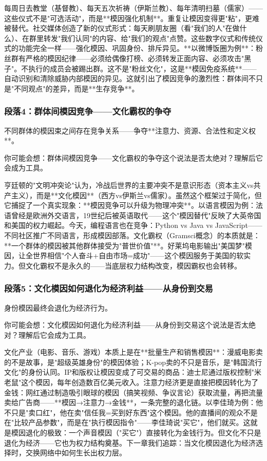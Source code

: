 \documentclass[openany, a4paper, 12pt]{book}
\newenvironment{motivation}{
	\vspace{0.5em}
	\begin{tcolorbox}[
		colback=gray!10,           %
		colframe=gray!60,          %
		title=\textit{本章动机 (Motivation)},
		fonttitle=\bfseries,
		arc=0mm,                   %
		leftrule=3mm               %
		]
		\small \itshape %
	}{
	\end{tcolorbox}
	\vspace{1em}
}
\begin{document}
\begin{motivation}
\begin{motivation}
\begin{motivation}
每周日去教堂（基督教）、每天五次祈祷（伊斯兰教）、每年清明扫墓（儒家）——这些仪式不是"可选活动"，而是**模因强化机制**。重复让模因变得更"粘"，更难被替代。社交媒体创造了新的仪式形式：每天刷朋友圈（看"我们的人"在做什么）、在群里转发"我们认同"的内容、给"我们的观点"点赞。这些数字仪式和传统仪式的功能完全一样——强化模因、巩固身份、排斥异见。**以微博饭圈为例**：粉丝群有严格的模因纪律——必须给偶像打榜、必须转发正面内容、必须攻击"黑子"。不执行的成员会被踢出群。这不是"粉丝文化"，这是**模因免疫系统**——自动识别和清除威胁内部模因的异见。这就引出了模因竞争的激烈性：群体间不只是"不同观点"的差异，而是**生存竞争**。

	\subsubsection*{段落4：群体间模因竞争——文化霸权的争夺}
	不同群体的模因束之间存在竞争关系——争夺**注意力、资源、合法性和定义权**。
	\begin{tcolorbox}[colback=yellow!5, title=\textit{读者行为预测}]
		你可能会想：群体间模因竞争——文化霸权的争夺这个说法是否太绝对？理解后它会成为工具。
	\end{tcolorbox}

亨廷顿的"文明冲突论"认为，冷战后世界的主要冲突不是意识形态（资本主义vs共产主义），而是**文化模因**（西方vs伊斯兰vs儒家）。虽然这个框架过于简化，但它捕捉了一个真实现象：**模因竞争可以升级为物理冲突**。以语言模因为例：法语曾经是欧洲外交语言，19世纪后被英语取代——这个"模因替代"反映了大英帝国和美国的权力崛起。今天，编程语言也在竞争：Python vs Java vs JavaScript——不同社区推广不同语言，形成模因部落。文化霸权（Gramsci概念）的本质就是：**一个群体的模因被其他群体接受为"普世价值"**。好莱坞电影输出"美国梦"模因，让全世界相信"个人奋斗+自由市场=成功"——这个模因服务于美国的软实力。但文化霸权不是永久的——当底层权力结构改变，模因霸权也会转移。

	\subsubsection*{段落5：文化模因如何退化为经济利益——从身份到交易}
	身份模因最终会退化为经济行为。
	\begin{tcolorbox}[colback=yellow!5, title=\textit{读者行为预测}]
		你可能会想：文化模因如何退化为经济利益——从身份到交易这个说法是否太绝对？理解后它会成为工具。
	\end{tcolorbox}

文化产业（电影、音乐、游戏）本质上是在**批量生产和销售模因**：漫威电影卖的不是故事，是"超级英雄身份"的模因体验；K-pop卖的不只是音乐，是"韩国流行文化"的身份认同。IP和版权让模因变成了可交易的商品：迪士尼通过版权控制"米老鼠"这个模因，每年创造数百亿美元收入。注意力经济更是直接把模因转化为了金钱：网红通过制造吸引眼球的模因（搞笑视频、争议言论）获取流量，再把流量卖给广告商——**模因→注意力→金钱**，一条完整的退化链。以李佳琦为例：他不只是"卖口红"，他在卖"信任我=买到好东西"这个模因。他的直播间的观众不是在"比较产品参数"，而是在"执行模因指令"——李佳琦说"买它"，他们就买。这就是模因退化的极致：一个声音模因（"买它"）直接转化为金钱行为。但文化不只是退化为经济——它也为权力结构奠基。下一章我们追踪：当文化模因退化为经济选择时，交换网络中如何生长出权力层。


\end{motivation}
\end{motivation}
\end{motivation}
\end{document}
